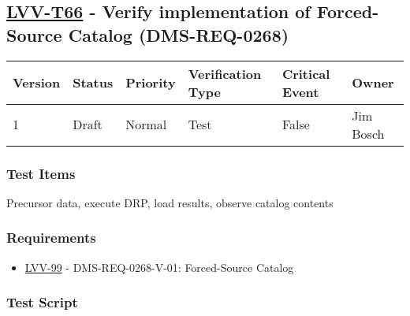 \hypertarget{lvv-t66---verify-implementation-of-forced-source-catalog-dms-req-0268}{%
\subsection{\texorpdfstring{\href{https://jira.lsstcorp.org/secure/Tests.jspa\#/testCase/LVV-T66}{LVV-T66}
- Verify implementation of Forced-Source Catalog
(DMS-REQ-0268)}{LVV-T66 - Verify implementation of Forced-Source Catalog (DMS-REQ-0268)}}\label{lvv-t66---verify-implementation-of-forced-source-catalog-dms-req-0268}}

\begin{longtable}[]{@{}llllll@{}}
\toprule
Version & Status & Priority & Verification Type & Critical Event &
Owner\tabularnewline
\midrule
\endhead
1 & Draft & Normal & Test & False & Jim Bosch\tabularnewline
\bottomrule
\end{longtable}

\hypertarget{test-items-42}{%
\subsubsection{Test Items}\label{test-items-42}}

Precursor data, execute DRP, load results, observe catalog contents

\hypertarget{requirements-43}{%
\subsubsection{Requirements}\label{requirements-43}}

\begin{itemize}
\tightlist
\item
  \href{https://jira.lsstcorp.org/browse/LVV-99}{LVV-99} -
  DMS-REQ-0268-V-01: Forced-Source Catalog
\end{itemize}

\hypertarget{test-script-43}{%
\subsubsection{Test Script}\label{test-script-43}}

